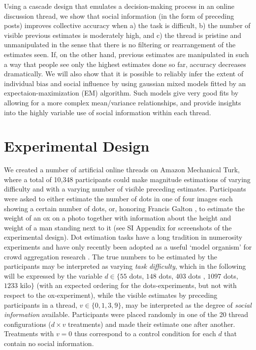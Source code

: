 \documentclass[9pt,twocolumn,twoside,lineno]{pnas-new}
\begin{document}
Using a cascade design that emulates a decision-making process in an online discussion thread,  we show that social information (in the form of preceding posts) improves collective accuracy when a) the task is difficult, b) the number of visible previous estimates is moderately high, and c) the thread is pristine and unmanipulated in the sense that there is no filtering or rearrangement of the estimates seen. If, on the other hand, previous estimates are manipulated in such a way that people see only the highest estimates done so far, accuracy decreases dramatically. We will also show that it is possible to reliably infer the extent of individual bias and social influence by using gaussian mixed models fitted by an expectaion-maximization (EM) algorithm. Such models give very good fits by allowing for a more complex mean/variance relationships, and provide insights into the highly variable use of social information within each thread.

\section*{Experimental Design}
We created a number of artificial online threads on Amazon Mechanical Turk, where a total of 10,348 participants could make magnitude estimations of varying difficulty and with a varying number of visible preceding estimates. Participants were asked to either estimate the number of dots in one of four images each showing a certain number of dots, or, honoring Francis Galton \cite{galton1907vox}, to estimate the weight of an ox on a photo together with information about the height and weight of a man standing next to it (see SI Appendix for screenshots of the experimental design). Dot estimation tasks have a long tradition in numerosity experiments \cite{minturn1951effect, indow1977scaling, krueger1982single} and have only recently been adopted as a useful ‘model organism’ for crowd aggregation research \cite{horton2010dot, ugander2015wisdom}. The true numbers to be estimated by the participants may be interpreted as varying \textit{task difficulty}, which in the following will be expressed by the variable $d \in \{55$ dots, $148$ dots, $403$ dots , $1097$ dots, $1233$ kilo$\}$ (with an expected ordering for the dots-experiments, but not with respect to the ox-experiment), while the visible estimates by preceding participants in a thread, $v \in \{0,1,3,9\}$, may be interpreted as the degree of \textit{social information} available. Participants were placed randomly in one of the 20 thread configurations ($d \times v$ treatments) and made their estimate one after another. Treatments with $v=0$ thus correspond to a control condition for each $d$ that contain no social information. 
\end{document}
